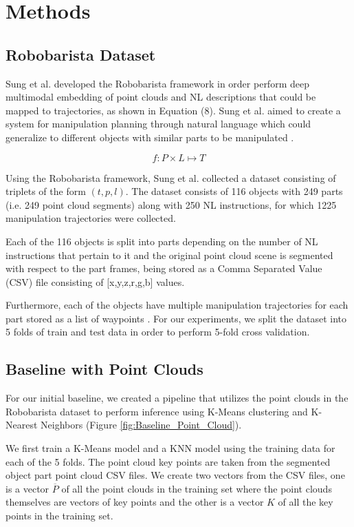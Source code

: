 \documentclass[letterpaper, 12 pt, conference]{ieeeconf}
\begin{document}
\section{Methods}

\subsection{Robobarista Dataset}

Sung et al. developed the Robobarista framework in order perform deep multimodal embedding of point clouds and NL descriptions that could be mapped to trajectories, as shown in Equation (8). Sung et al. aimed to create a system for manipulation planning through natural language which could generalize to different objects with similar parts to be manipulated \cite{sung2016robobarista}. 

\begin{equation}
f: P\times L \mapsto T
\end{equation}

Using the Robobarista framework, Sung et al. collected a dataset consisting of triplets of the form $(t, p, l)$. The dataset consists of 116 objects with 249 parts (i.e. 249 point cloud segments) along with 250 NL instructions, for which 1225 manipulation trajectories were collected. 

Each of the 116 objects is split into parts depending on the number of NL instructions that pertain to it and the original point cloud scene is segmented with respect to the part frames, being stored as a Comma Separated Value (CSV) file consisting of [x,y,z,r,g,b] values. 

Furthermore, each of the objects have multiple manipulation trajectories for each part stored as a list of waypoints \cite{sung2016robobarista}. For our experiments, we split the dataset into 5 folds of train and test data in order to perform 5-fold cross validation.

\subsection{Baseline with Point Clouds}
For our initial baseline, we created a pipeline that utilizes the point clouds in the Robobarista dataset to perform inference using K-Means clustering and K-Nearest Neighbors (Figure \ref{fig:Baseline_Point_Cloud}). 

We first train a K-Means model and a KNN model using the training data for each of the 5 folds. The point cloud key points are taken from the segmented object part point cloud CSV files. We create two vectors from the CSV files, one is a vector $\overline{P}$ of all the point clouds in the training set where the point clouds themselves are vectors of key points and the other is a vector $K$ of all the key points in the training set. 
\end{document}
